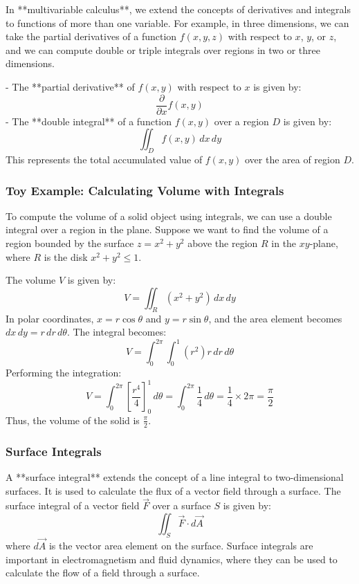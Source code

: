 \documentclass{article}
\begin{document}
In **multivariable calculus**, we extend the concepts of derivatives and integrals to functions of more than one variable. For example, in three dimensions, we can take the partial derivatives of a function \( f(x, y, z) \) with respect to \( x \), \( y \), or \( z \), and we can compute double or triple integrals over regions in two or three dimensions.

- The **partial derivative** of \( f(x, y) \) with respect to \( x \) is given by:
  \[
  \frac{\partial}{\partial x} f(x, y)
  \]
- The **double integral** of a function \( f(x, y) \) over a region \( D \) is given by:
  \[
  \iint_D f(x, y) \, dx \, dy
  \]
  This represents the total accumulated value of \( f(x, y) \) over the area of region \( D \).

\subsubsection*{Toy Example: Calculating Volume with Integrals}

To compute the volume of a solid object using integrals, we can use a double integral over a region in the plane. Suppose we want to find the volume of a region bounded by the surface \( z = x^2 + y^2 \) above the region \( R \) in the \( xy \)-plane, where \( R \) is the disk \( x^2 + y^2 \leq 1 \).

The volume \( V \) is given by:
\[
V = \iint_R (x^2 + y^2) \, dx \, dy
\]
In polar coordinates, \( x = r \cos \theta \) and \( y = r \sin \theta \), and the area element becomes \( dx \, dy = r \, dr \, d\theta \). The integral becomes:
\[
V = \int_0^{2\pi} \int_0^1 (r^2) r \, dr \, d\theta
\]
Performing the integration:
\[
V = \int_0^{2\pi} \left[ \frac{r^4}{4} \right]_0^1 \, d\theta = \int_0^{2\pi} \frac{1}{4} \, d\theta = \frac{1}{4} \times 2\pi = \frac{\pi}{2}
\]
Thus, the volume of the solid is \( \frac{\pi}{2} \).

\subsubsection*{Surface Integrals}

A **surface integral** extends the concept of a line integral to two-dimensional surfaces. It is used to calculate the flux of a vector field through a surface. The surface integral of a vector field \( \vec{F} \) over a surface \( S \) is given by:
\[
\iint_S \vec{F} \cdot d\vec{A}
\]
where \( d\vec{A} \) is the vector area element on the surface. Surface integrals are important in electromagnetism and fluid dynamics, where they can be used to calculate the flow of a field through a surface.
\end{document}
